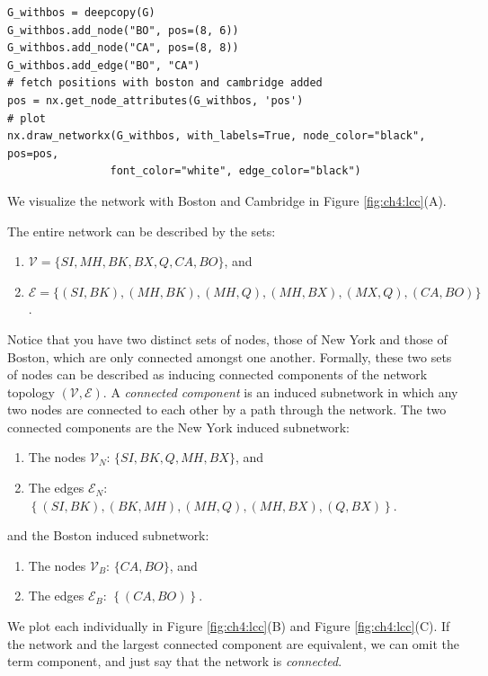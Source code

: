 \begin{lstlisting}[style=python]
G_withbos = deepcopy(G)
G_withbos.add_node("BO", pos=(8, 6))
G_withbos.add_node("CA", pos=(8, 8))
G_withbos.add_edge("BO", "CA")
# fetch positions with boston and cambridge added
pos = nx.get_node_attributes(G_withbos, 'pos')
# plot
nx.draw_networkx(G_withbos, with_labels=True, node_color="black", pos=pos,
                font_color="white", edge_color="black")
\end{lstlisting}

We visualize the network with Boston and Cambridge in Figure \ref{fig:ch4:lcc}(A). 

The entire network can be described by the sets:
\begin{enumerate}
    \item $\mathcal V = \{SI, MH, BK, BX, Q, CA, BO\}$, and
    \item $\mathcal E = \{(SI, BK), (MH, BK), (MH, Q), (MH, BX), (MX, Q), (CA, BO)\}$.
\end{enumerate}

Notice that you have two distinct sets of nodes, those of New York and those of Boston, which are {only} connected amongst one another. Formally, these two sets of nodes can be described as inducing {connected components} of the network topology $(\mathcal V, \mathcal E)$. A \textit{connected component} is an induced subnetwork in which any two nodes are connected to each other by a path through the network. The two connected components are the New York induced subnetwork:

\begin{enumerate}
    \item The nodes $\mathcal V_N$: $\{SI, BK, Q, MH, BX\}$, and
    \item The edges $\mathcal E_N$: $\left\{(SI, BK), (BK, MH), (MH, Q), (MH, BX), (Q, BX)\right\}$.
\end{enumerate}

and the Boston induced subnetwork:
\begin{enumerate}
    \item The nodes $\mathcal V_B$: $\{CA, BO\}$, and
    \item The edges $\mathcal E_B$: $\left\{(CA, BO)\right\}$.
\end{enumerate}

We plot each individually in Figure \ref{fig:ch4:lcc}(B) and Figure \ref{fig:ch4:lcc}(C). If the network and the largest connected component are equivalent, we can omit the term {component}, and just say that the network is \textit{connected}.


